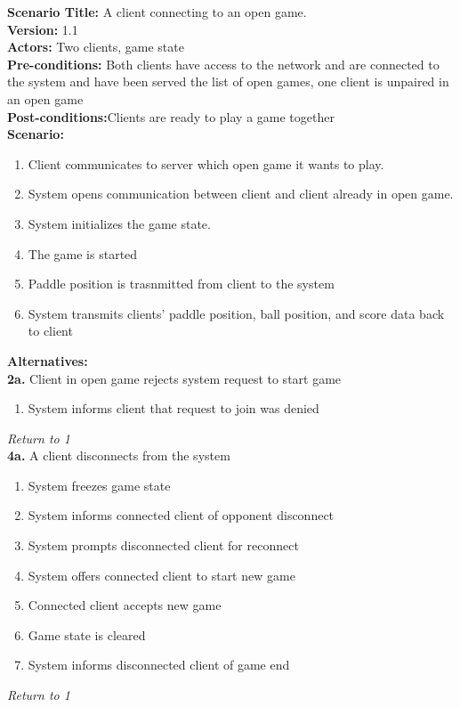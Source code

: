 \documentclass[letterpaper,12pt]{article}
\begin{document}
\noindent \textbf{Scenario Title:} A client connecting to an open game.\\
\textbf{Version:} 1.1\\
\textbf{Actors:} Two clients, game state\\
\textbf{Pre-conditions:} Both clients have access to the network and are connected to the system and have been served the list of open games, one client is unpaired in an open game\\
\textbf{Post-conditions:}Clients are ready to play a game together\\
\textbf{Scenario:}
\begin{enumerate}
\item Client communicates to server which open game it wants to play.
\item System opens communication between client and client already in open game.
\item System initializes the game state.
\item The game is started
\item Paddle position is trasnmitted from client to the system
\item System transmits clients' paddle position, ball position, and score data back to client
\end{enumerate}
\textbf{Alternatives:}\\
\textbf{2a.} Client in open game rejects system request to start game 
\begin{enumerate}
\item System informs client that request to join was denied
\end{enumerate}
\emph{Return to 1}\\
\textbf{4a.} A client disconnects from the system
\begin{enumerate}
\item System freezes game state
\item System informs connected client of opponent disconnect
\item System prompts disconnected client for reconnect
\item System offers connected client to start new game
\item Connected client accepts new game
\item Game state is cleared
\item System informs disconnected client of game end
\end{enumerate}
\emph{Return to 1}\\
\end{document}
